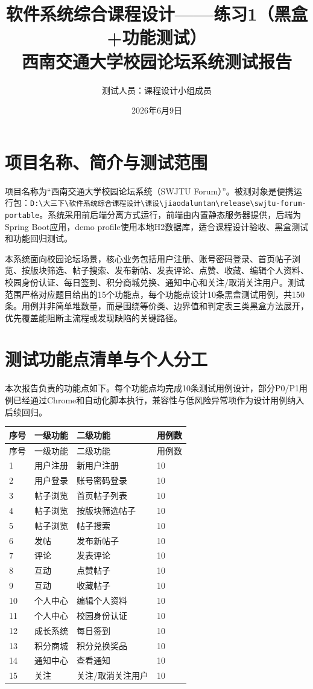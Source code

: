 \documentclass[UTF8,zihao=-4]{ctexart}
\title{软件系统综合课程设计——练习1（黑盒+功能测试）\\西南交通大学校园论坛系统测试报告}
\author{测试人员：课程设计小组成员}
\date{2026年6月9日}
\begin{document}
\maketitle
\tableofcontents
\newpage

\section{项目名称、简介与测试范围}
项目名称为“西南交通大学校园论坛系统（SWJTU Forum）”。被测对象是便携运行包：\texttt{D:\textbackslash 大三下\textbackslash 软件系统综合课程设计\textbackslash 课设\textbackslash jiaodaluntan\textbackslash release\textbackslash swjtu-forum-portable}。系统采用前后端分离方式运行，前端由内置静态服务器提供，后端为Spring Boot应用，demo profile使用本地H2数据库，适合课程设计验收、黑盒测试和功能回归测试。

本系统面向校园论坛场景，核心业务包括用户注册、账号密码登录、首页帖子浏览、按版块筛选、帖子搜索、发布新帖、发表评论、点赞、收藏、编辑个人资料、校园身份认证、每日签到、积分商城兑换、通知中心和关注/取消关注用户。测试范围严格对应题目给出的15个功能点，每个功能点设计10条黑盒测试用例，共150条。用例并非简单堆数量，而是围绕等价类、边界值和判定表三类黑盒方法展开，优先覆盖能阻断主流程或发现缺陷的关键路径。

\section{测试功能点清单与个人分工}
本次报告负责的功能点如下。每个功能点均完成10条测试用例设计，部分P0/P1用例已经通过Chrome和自动化脚本执行，兼容性与低风险异常项作为设计用例纳入后续回归。

\begin{longtable}{P{1.2cm}P{3cm}P{6cm}P{2cm}}
\toprule
序号 & 一级功能 & 二级功能 & 用例数\\
\midrule
\endfirsthead
\toprule
序号 & 一级功能 & 二级功能 & 用例数\\
\midrule
{} & 用户注册 & 新用户注册 & 10 \\
2 & 用户登录 & 账号密码登录 & 10 \\
3 & 帖子浏览 & 首页帖子列表 & 10 \\
4 & 帖子浏览 & 按版块筛选帖子 & 10 \\
5 & 帖子浏览 & 帖子搜索 & 10 \\
6 & 发帖 & 发布新帖子 & 10 \\
7 & 评论 & 发表评论 & 10 \\
8 & 互动 & 点赞帖子 & 10 \\
9 & 互动 & 收藏帖子 & 10 \\
10 & 个人中心 & 编辑个人资料 & 10 \\
11 & 个人中心 & 校园身份认证 & 10 \\
12 & 成长系统 & 每日签到 & 10 \\
13 & 积分商城 & 积分兑换奖品 & 10 \\
14 & 通知中心 & 查看通知 & 10 \\
15 & 关注 & 关注/取消关注用户 & 10 \\
\bottomrule
\end{longtable}
\end{document}
